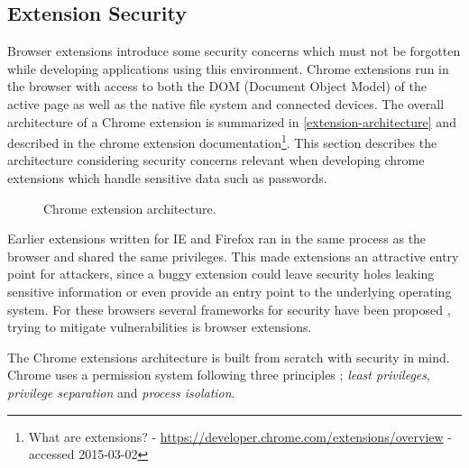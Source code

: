 \subsection{Extension Security}\label{extension-sec}
\par Browser extensions introduce some security concerns which must not be forgotten while developing applications using this environment. Chrome extensions run in the browser with access to both the DOM (Document Object Model) of the active page as well as the native file system and connected devices. The overall architecture of a Chrome extension is summarized in \autoref{extension-architecture} and described in the chrome extension documentation\footnote{What are extensions? - \url{https://developer.chrome.com/extensions/overview} - accessed 2015-03-02}. This section describes the architecture considering security concerns relevant when developing chrome extensions which handle sensitive data such as passwords.



\begin{figure}[ht]
    \caption{Chrome extension architecture.}
    \label{extension-architecture}
\end{figure}

\par Earlier extensions written for IE and Firefox ran in the same process as the browser and shared the same privileges. This made extensions an attractive entry point for attackers, since a buggy extension could leave security holes leaking sensitive information or even provide an entry point to the underlying operating system. For these browsers several frameworks for security have been proposed \cite{firefox-ie, js-info-flow}, trying to mitigate vulnerabilities is browser extensions. 
\par The Chrome extensions architecture is built from scratch with security in mind. Chrome uses a permission system following three principles \cite{liu-chrome}; \emph{least privileges}, \emph{privilege separation} and \emph{process isolation}. 

